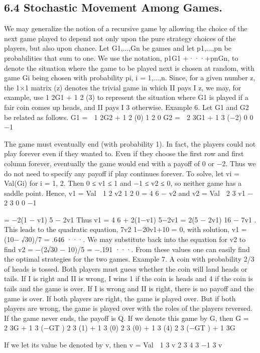 \documentclass[]{report}
\begin{document}
\subsection{6.4 Stochastic Movement Among Games.} We may generalize the notion of a
recursive game by allowing the choice of the next game played to depend not only upon the
pure strategy choices of the players, but also upon chance. Let G1,...,Gn be games and
let p1,...,pn be probabilities that sum to one. We use the notation, p1G1 +···+pnGn, to
denote the situation where the game to be played next is chosen at random, with game Gi
being chosen with probability pi, i = 1,...,n. Since, for a given number z, the 1×1 matrix
(z) denotes the trivial game in which II pays I z, we may, for example, use 1
2G1 + 1
2 (3) to
represent the situation where G1 is played if a fair coin comes up heads, and II pays I 3
otherwise.
Example 6. Let G1 and G2 be related as follows.
G1 =
 1
2G2 + 1
2 (0) 1
2 0
G2 =
 2
3G1 + 1
3 (−2) 0
0 −1

The game must eventually end (with probability 1). In fact, the players could not play
forever even if they wanted to. Even if they choose the first row and first column forever,
eventually the game would end with a payoff of 0 or −2. Thus we do not need to specify
any payoff if play continues forever. To solve, let vi = Val(Gi) for i = 1, 2. Then 0 ≤ v1 ≤ 1
and −1 ≤ v2 ≤ 0, so neither game has a saddle point. Hence,
v1 = Val  1
2 v2 1
2 0
= 4
6 − v2
and
v2 = Val  2
3 v1 − 2
3 0
0 −1

= −2(1 − v1)
5 − 2v1
Thus
v1 = 4
6 + 2(1−v1)
5−2v1
= 2(5 − 2v1)
16 − 7v1
.
This leads to the quadratic equation, 7v2
1−20v1+10 = 0, with solution, v1 = (10−
√30)/7 =
.646 ···. We may substitute back into the equation for v2 to find v2 = −(2√30 − 10)/5 =
−.191 ···. From these values one can easily find the optimal strategies for the two games.
Example 7. A coin with probability 2/3 of heads is tossed. Both players must guess
whether the coin will land heads or tails. If I is right and II is wrong, I wins 1 if the coin
is heads and 4 if the coin is tails and the game is over. If I is wrong and II is right, there
is no payoff and the game is over. If both players are right, the game is played over. But
if both players are wrong, the game is played over with the roles of the players reversed.
If the game never ends, the payoff is Q.
If we denote this game by G, then
G =
 2
3G + 1
3 (−GT ) 2
3 (1) + 1
3 (0)
2
3 (0) + 1
3 (4) 2
3 (−GT ) + 1
3G

If we let its value be denoted by v, then
v = Val  1
3 v 2
3 4
3 −1
3 v
\end{document}
